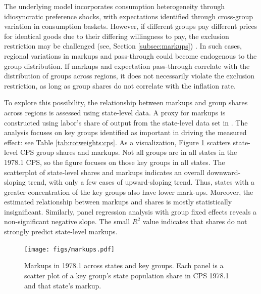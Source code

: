 \documentclass[12pt]{article}
\begin{document}
The underlying model incorporates consumption heterogeneity through idiosyncratic preference shocks, with expectations identified through cross-group variation in consumption baskets. However, if different groups pay different prices for identical goods due to their differing willingness to pay, the exclusion restriction may be challenged (see, Section \ref{subsec:markups}) . In such cases, regional variations in markups and pass-through could become endogenous to the group distribution. If markups and expectation pass-through correlate with the distribution of groups across regions, it does not necessarily violate the exclusion restriction, as long as group shares do not correlate with the inflation rate. 

To explore this possibility, the relationship between markups and group shares across regions is assessed using state-level data. A proxy for markups is constructed using labor's share of output from the state-level data set in \cite{NakamuraSteinsson:AER2014}. The analysis focuses on key groups identified as important in driving the measured effect: see Table \ref{tab:rotweights:cps}.  As a visualization, Figure \ref{fig:markupsFig} scatters state-level CPS group shares and markups.  Not all groups are in all states in the 1978.1 CPS, so the figure focuses on those key groups in all states.  The scatterplot of state-level shares and markups indicates an overall downward-sloping trend, with only a few cases of upward-sloping trend.  Thus, states with a greater concentration of the key groups also have lower mark-ups. Moreover, the estimated relationship between markups and shares is mostly statistically insignificant. Similarly, panel regression analysis with group fixed effects reveals a non-significant negative slope. The small $R^2$ value indicates that shares do not strongly predict state-level markups. 

\begin{figure}
\centering
\caption{Markups in 1978.1 across states and key groups. Each panel is a scatter plot of a key group's state population share in CPS 1978.1 and that state's markup.}\label{fig:markupsFig}
\centering
\texttt{[image: figs/markups.pdf]}
\end{figure}




\end{document}
